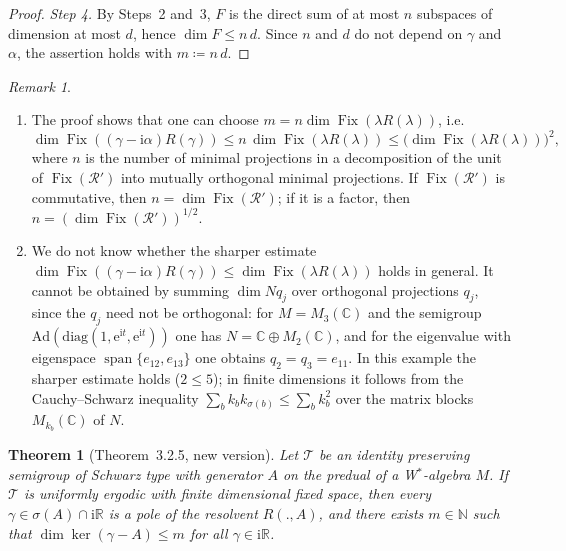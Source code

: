 \documentclass[11pt,a4paper]{article}
\newtheorem{theorem}[proposition]{Theorem}
\theoremstyle{remark}
\newtheorem{remark}[proposition]{Remark}
\newcommand{\R}{\mathbb{R}}
\newcommand{\C}{\mathbb{C}}
\newcommand{\N}{\mathbb{N}}
\newcommand{\im}{\mathrm{i}}
\newcommand{\1}{\mathbf{1}}
\newcommand{\RR}{\mathcal{R}}
\newcommand{\TT}{\mathcal{T}}
\newcommand{\Fix}[1]{\operatorname{Fix}(#1)}
\newcommand{\Kern}[1]{\ker(#1)}
\newcommand{\eu}{\mathrm{e}}
\newcommand{\ie}{i.e.}
\newcommand{\WA}{W$^{*}$}
\begin{document}
\begin{proof}
\emph{Step 4.}
By Steps~2 and~3, $F$ is the direct sum of at most $n$ subspaces of dimension at most $d$, hence $\dim F \le n\,d$.
Since $n$ and $d$ do not depend on $\gamma$ and $\alpha$, the assertion holds with $m \coloneqq n\,d$.
\end{proof}

\begin{remark}\label{rem:schranke}
\begin{enumerate}[label=(\roman*), wide, labelindent=0pt]
\item The proof shows that one can choose $m = n \dim \Fix{\lambda R(\lambda)}$, \ie
\[
  \dim \Fix{(\gamma - \im\alpha)R(\gamma)} \le n\,\dim \Fix{\lambda R(\lambda)} \le \bigl(\dim \Fix{\lambda R(\lambda)}\bigr)^{2},
\]
where $n$ is the number of minimal projections in a decomposition of the unit of\/ $\Fix{\RR'}$ into mutually orthogonal minimal projections.
If\/ $\Fix{\RR'}$ is commutative, then $n = \dim \Fix{\RR'}$; if it is a factor, then $n = (\dim\Fix{\RR'})^{1/2}$.

\item We do not know whether the sharper estimate $\dim \Fix{(\gamma - \im\alpha)R(\gamma)} \le \dim \Fix{\lambda R(\lambda)}$ holds in general.
It cannot be obtained by summing $\dim Nq_j$ over orthogonal projections $q_j$, since the $q_j$ need not be orthogonal:
for $M = M_{3}(\C)$ and the semigroup $\mathrm{Ad}(\mathrm{diag}(1, \eu^{\im t}, \eu^{\im t}))$ one has $N = \C \oplus M_{2}(\C)$, and for the eigenvalue with eigenspace $\operatorname{span}\{e_{12}, e_{13}\}$ one obtains $q_2 = q_3 = e_{11}$.
In this example the sharper estimate holds ($2 \le 5$); in finite dimensions it follows from the Cauchy--Schwarz inequality $\sum_b k_b k_{\sigma(b)} \le \sum_b k_b^{2}$ over the matrix blocks $M_{k_b}(\C)$ of\/ $N$.
\end{enumerate}
\end{remark}

\begin{theorem}[Theorem~3.2.5, new version]
Let $\TT$ be an identity preserving semigroup of Schwarz type with generator $A$ on the predual of a \WA-algebra $M$.
If\/ $\TT$ is uniformly ergodic with finite dimensional fixed space, then every $\gamma \in \sigma(A) \cap \im\R$ is a pole of the resolvent $R(.,A)$, and there exists $m \in \N$ such that $\dim \Kern{\gamma - A} \le m$ for all $\gamma \in \im\R$.
\end{theorem}
\end{document}
